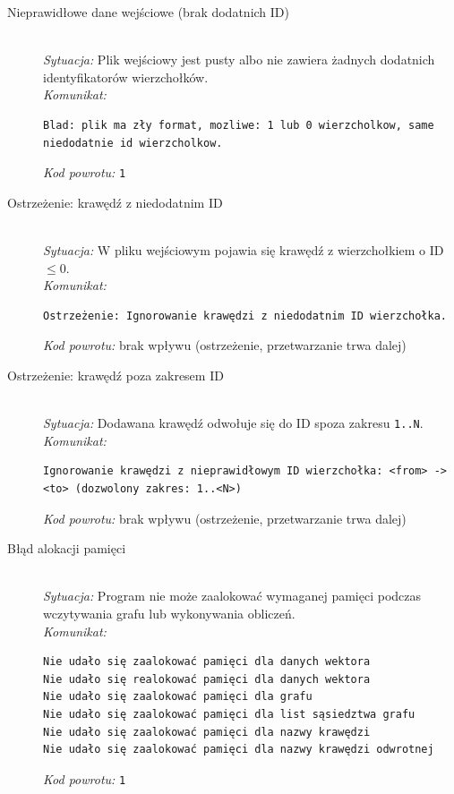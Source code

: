 \documentclass[12pt]{article}
\begin{document}
\begin{description}
	\item[Nieprawidłowe dane wejściowe (brak dodatnich ID)]
	      \hfill \\
	      \textit{Sytuacja:} Plik wejściowy jest pusty albo nie zawiera żadnych dodatnich
	      identyfikatorów wierzchołków. \\
	      \textit{Komunikat:}
	      \begin{verbatim}
Blad: plik ma zły format, mozliwe: 1 lub 0 wierzcholkow, same niedodatnie id wierzcholkow.
	      \end{verbatim}
	      \textit{Kod powrotu:} \texttt{1}

	\item[Ostrzeżenie: krawędź z niedodatnim ID]
	      \hfill \\
	      \textit{Sytuacja:} W pliku wejściowym pojawia się krawędź z wierzchołkiem o ID $\le 0$. \\
	      \textit{Komunikat:}
	      \begin{verbatim}
Ostrzeżenie: Ignorowanie krawędzi z niedodatnim ID wierzchołka.
	      \end{verbatim}
	      \textit{Kod powrotu:} brak wpływu (ostrzeżenie, przetwarzanie trwa dalej)

	\item[Ostrzeżenie: krawędź poza zakresem ID]
	      \hfill \\
	      \textit{Sytuacja:} Dodawana krawędź odwołuje się do ID spoza zakresu \texttt{1..N}. \\
	      \textit{Komunikat:}
	      \begin{verbatim}
Ignorowanie krawędzi z nieprawidłowym ID wierzchołka: <from> -> <to> (dozwolony zakres: 1..<N>)
	      \end{verbatim}
	      \textit{Kod powrotu:} brak wpływu (ostrzeżenie, przetwarzanie trwa dalej)

	\item[Błąd alokacji pamięci]
	      \hfill \\
	      \textit{Sytuacja:} Program nie może zaalokować wymaganej pamięci podczas
	      wczytywania grafu lub wykonywania obliczeń. \\
	      \textit{Komunikat:}
	      \begin{verbatim}
Nie udało się zaalokować pamięci dla danych wektora
Nie udało się realokować pamięci dla danych wektora
Nie udało się zaalokować pamięci dla grafu
Nie udało się zaalokować pamięci dla list sąsiedztwa grafu
Nie udało się zaalokować pamięci dla nazwy krawędzi
Nie udało się zaalokować pamięci dla nazwy krawędzi odwrotnej
	      \end{verbatim}
	      \textit{Kod powrotu:} \texttt{1}


\end{description}
\end{document}
